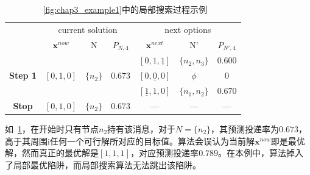 \begin{table}[hbt]
  \caption{\figurename~\ref{fig:chap3_example1}中的局部搜索过程示例}
  \centering
  \begin{tabular}{|c|c|c|c|c|c|c|}
    \hline
    & \multicolumn{3}{c|}{current solution}
    & \multicolumn{3}{c|}{next options}
    \\    
    \cline{2-7}
    
    & $\textbf{x}^{now}$ & N & $P_{N,4}$ & $\textbf{x}^{next}$ & N' & $P_{N',4}$ \\
    \hline
    
    \multicolumn{1}{|c|}{\multirow{3}{*}{\textbf{Step 1}}}
    &\multicolumn{1}{c|}{\multirow{3}{*}{$[0,1,0]$}}
    &\multicolumn{1}{c|}{\multirow{3}{*}{$\{n_2\}$}}
    &\multicolumn{1}{c|}{\multirow{3}{*}{$0.673$}}
    &$[0,1,\underline{1}]$ &$\{n_2,n_3\}$ & $0.600$ 
    \\
    
    \multicolumn{1}{|c|}{}
    &\multicolumn{1}{c|}{}
    &\multicolumn{1}{c|}{}
     &\multicolumn{1}{c|}{}
    &$[0,\underline{0},0]$ & $\phi$ & $0$
    \\
    
    \multicolumn{1}{|c|}{}
    &\multicolumn{1}{c|}{}
    &\multicolumn{1}{c|}{}
        &\multicolumn{1}{c|}{}
    &$[\underline{1},1,0]$ & $\{n_1,n_2\}$ & $0.670$
    \\
    
    \hline
    \multicolumn{1}{|c|}{\multirow{3}{*}{\textbf{Stop}}}
    &\multicolumn{1}{c|}{\multirow{3}{*}{$[0,1,0]$}}
    &\multicolumn{1}{c|}{\multirow{3}{*}{$\{n_2\}$}}
    &\multicolumn{1}{c|}{\multirow{3}{*}{$0.673$}}
    &\multicolumn{1}{c|}{\multirow{3}{*}{---}} 
    &\multicolumn{1}{c|}{\multirow{3}{*}{---}}  
    &\multicolumn{1}{c|}{\multirow{3}{*}{---}}   
    \\
    
    \multicolumn{1}{|c|}{}
    &\multicolumn{1}{c|}{}
    &\multicolumn{1}{c|}{}
     &\multicolumn{1}{c|}{}
    & &  & 
    \\
    
    \multicolumn{1}{|c|}{}
    &\multicolumn{1}{c|}{}
    &\multicolumn{1}{c|}{}
        &\multicolumn{1}{c|}{}
    & &  & 
    \\
    \hline    
  \end{tabular} 
  \label{tab:chap3_local_search}
\end{table}

如\figurename~\ref{tab:chap3_local_search}，在开始时只有节点$n_2$持有该消息，对于$N=\{n_2\}$，其预测投递率为$0.673$，高于其周围i任何一个可行解所对应的目标值。算法会误认为当前解$\bm{x}^{now}$即是最优解，然而真正的最优解是$[1,1,1]$，对应预测投递率$0.789$。在本例中，算法掉入了局部最优陷阱，而局部搜索算法无法跳出该陷阱。

